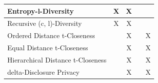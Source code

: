 \documentclass[12pt, a4paper,oneside]{report}
\begin{document}
\begin{table}[]
{\begin{tabular}{|l|c|c|c|c|}
			Entropy-l-Diversity                                   & X                                                                              & X                                                                                 &                                                                              &                                                                                     \\ \hline
			Recursive (c, l)-Diversity                            & X                                                                              & X                                                                                 &                                                                              &                                                                                     \\ \hline
			Ordered Distance t-Closeness                          &                                                                                & X                                                                                 &                                                                              & X                                                                                   \\ \hline
			Equal Distance t-Closeness                            &                                                                                & X                                                                                 &                                                                              & X                                                                                   \\ \hline
			Hierarchical Distance t-Closeness                     &                                                                                & X                                                                                 &                                                                              & X                                                                                   \\ \hline
			delta-Disclosure Privacy                              &                                                                                & X                                                                                 &                                                                              & X                                                                                   \\ \hline

\end{tabular}}
\end{table}
\end{document}
